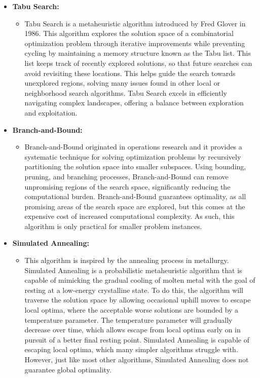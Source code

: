 \documentclass{article}
\begin{document}
\begin{itemize}
    \item \textbf{Tabu Search:} 
    \begin{itemize}
        \item Tabu Search is a metaheuristic algorithm introduced by Fred Glover in 1986. This algorithm explores the solution space of a combinatorial optimization problem through iterative improvements while preventing cycling by maintaining a memory structure known as the Tabu list. This list keeps track of recently explored solutions, so that future searches can avoid revisiting these locations. This helps guide the search towards unexplored regions, solving many issues found in other local or neighborhood search algorithms. Tabu Search excels in efficiently navigating complex landscapes, offering a balance between exploration and exploitation.
    \end{itemize}

    \item \textbf{Branch-and-Bound:}
    \begin{itemize}
        \item Branch-and-Bound originated in operations research and it provides a systematic technique for solving optimization problems by recursively partitioning the solution space into smaller subspaces. Using bounding, pruning, and branching processes, Branch-and-Bound can remove unpromising regions of the search space, significantly reducing the computational burden. Branch-and-Bound guarantees optimality, as all promising areas of the search space are explored, but this comes at the expensive cost of increased computational complexity. As such, this algorithm is only practical for smaller problem instances.
    \end{itemize}

    \item \textbf{Simulated Annealing:}
    \begin{itemize}
        \item This algorithm is inspired by the annealing process in metallurgy. Simulated Annealing is a probabilistic metaheuristic algorithm that is capable of mimicking the gradual cooling of molten metal with the goal of resting at a low-energy crystalline state. To do this, the algorithm will traverse the solution space by allowing occasional uphill moves to escape local optima, where the acceptable worse solutions are bounded by a temperature parameter. The temperature parameter will gradually decrease over time, which allows escape from local optima early on in pursuit of a better final resting point. Simulated Annealing is capable of escaping local optima, which many simpler algorithms struggle with. However, just like most other algorithms, Simulated Annealing does not guarantee global optimality.
    \end{itemize}


\end{itemize}
\end{document}
